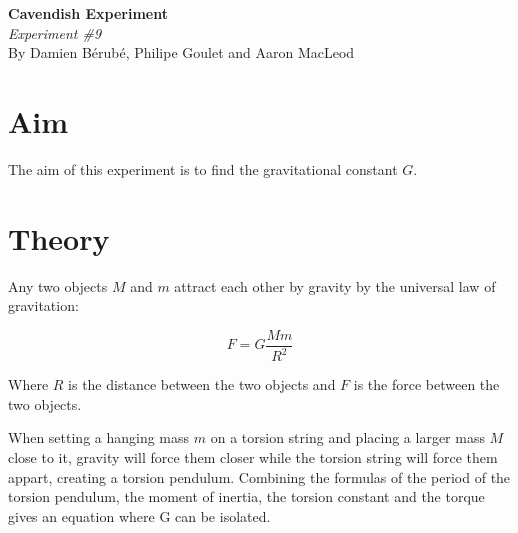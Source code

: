 \documentclass[12pt]{article}
\begin{document}
\begin{center}
    \large\textbf{Cavendish Experiment}\\
\normalsize \textit{Experiment \#9}\\
    By Damien Bérubé, Philipe Goulet and Aaron MacLeod
\end{center}
\section*{Aim}

The aim of this experiment is to find the gravitational constant $G$.

 \section*{Theory}

    Any two objects $M$ and $m$ attract each other by gravity by the universal law of gravitation:

    \begin{equation}
        F=G\frac{Mm}{R^2}
    \end{equation}

    Where $R$ is the distance between the two objects and $F$ is the force between the two objects.

    When setting a hanging mass $m$ on a torsion string and placing a larger mass $M$ close to it, gravity will force them closer while the torsion string will force them appart, creating a torsion pendulum. Combining the formulas of the period of the torsion pendulum, the moment of inertia, the torsion constant and the torque gives an equation where G can be isolated.
\end{document}
